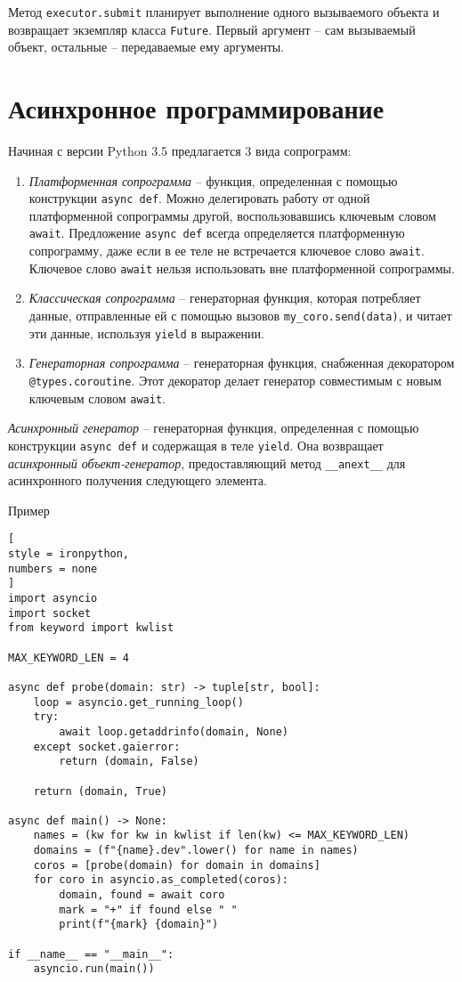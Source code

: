 \documentclass[%
	11pt,
	a4paper,
	utf8,
		]{article}
\begin{document}
Метод \verb|executor.submit| планирует выполнение одного вызываемого объекта и возвращает экземпляр класса \verb*|Future|. Первый аргумент -- сам вызываемый объект, остальные -- передаваемые ему аргументы.

\section{Асинхронное программирование}

Начиная с версии Python 3.5 предлагается 3 вида сопрограмм:
\begin{enumerate}
	\item \emph{Платформенная сопрограмма} -- функция, определенная с помощью конструкции \verb|async def|. Можно делегировать работу от одной платформенной сопрограммы другой, воспользовавшись ключевым словом \verb*|await|. Предложение \verb|async def| всегда определяется платформенную сопрограмму, даже если в ее теле не встречается ключевое слово \verb*|await|. Ключевое слово \verb|await| нельзя использовать вне платформенной сопрограммы.
	
	\item \emph{Классическая сопрограмма} -- генераторная функция, которая потребляет данные, отправленные ей с помощью вызовов \verb*|my_coro.send(data)|, и читает эти данные, используя \verb|yield| в выражении.
	
	\item \emph{Генераторная сопрограмма} -- генераторная функция, снабженная декоратором \verb*|@types.coroutine|. Этот декоратор делает генератор совместимым с новым ключевым словом \verb|await|.
\end{enumerate}

\emph{Асинхронный генератор} -- генераторная функция, определенная с помощью конструкции \verb*|async def| и содержащая в теле \verb|yield|. Она возвращает \emph{асинхронный объект-генератор}, предоставляющий метод \verb*|__anext__| для асинхронного получения следующего элемента.

Пример
\begin{lstlisting}[
style = ironpython,
numbers = none
]
import asyncio
import socket
from keyword import kwlist

MAX_KEYWORD_LEN = 4

async def probe(domain: str) -> tuple[str, bool]:
    loop = asyncio.get_running_loop()
    try:
        await loop.getaddrinfo(domain, None)
    except socket.gaierror:
        return (domain, False)
    
    return (domain, True)
    
async def main() -> None:
    names = (kw for kw in kwlist if len(kw) <= MAX_KEYWORD_LEN)
    domains = (f"{name}.dev".lower() for name in names)
    coros = [probe(domain) for domain in domains]
    for coro in asyncio.as_completed(coros):
        domain, found = await coro
        mark = "+" if found else " "
        print(f"{mark} {domain}")

if __name__ == "__main__":
    asyncio.run(main())
\end{lstlisting}
\end{document}
